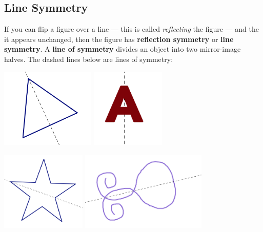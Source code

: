 \newpage
\subsection{Line Symmetry}
If you can flip  a figure over a line --- this is called \emph{reflecting} the figure ---  and the it appears unchanged, then the figure has {\bf reflection symmetry} or {\bf line symmetry}.  A {\bf line of symmetry} divides an object into two mirror-image halves. The dashed lines below are lines of symmetry:


\begin{center}
\includegraphics[height=3.8cm]{linesym1}
\qquad \qquad
\includegraphics[height=3.8cm]{linesym2}


\includegraphics[height=3.8cm]{linesym3}
\qquad \qquad
\includegraphics[height=3.8cm]{linesym4}
\end{center}


